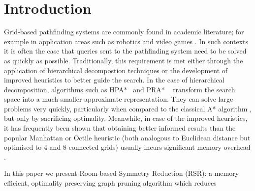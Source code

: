 \section{Introduction}
\label{introduction}

Grid-based pathfinding systems are commonly found in academic literature; for
example in application areas such as robotics \cite{choset05} and video games
\cite{botea04,sturtevant05,bjornsson06}.  
In such contexts it is often the case that queries sent to the pathfinding
system need to be solved as quickly as possible.  Traditionally, this
requirement is met either through the application of hierarchical decompostion
techniques or the development of improved heuristics to better guide the search.
In the case of hierarchical decomposition, algorithms such as
HPA*~\cite{botea04} and PRA* ~\cite{sturtevant05} transform the search space
into a much smaller approximate representation. They can solve large problems
very quickly, particularly when compared to the classical A* algorithm
\cite{hart68}, but only by sacrificing optimality.  Meanwhile, in case of the
improved heuristics, it has frequently been shown that obtaining better informed
results than the popular Manhattan or Octile heuristic (both analogous to
Euclidean distance but optimised to 4 and 8-connected grids) usually incurs
significant memory overhead \cite{sturtevant09,goldberg05,Cazenave:06}.
%
\par
In this paper we present Room-based Symmetry Reduction (RSR): a
memory efficient, optimality preserving graph pruning algorithm which reduces
